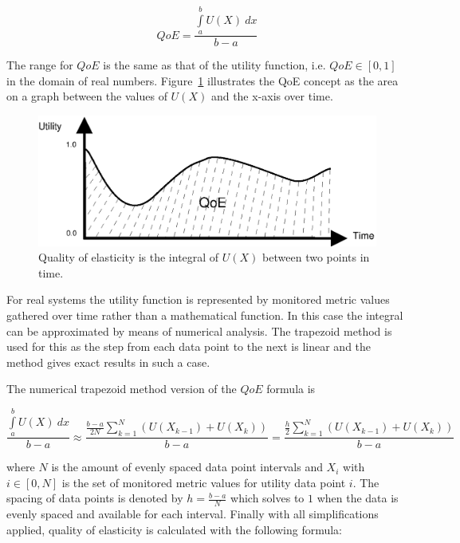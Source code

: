 \documentclass[english]{tktltiki2}
\theoremstyle{definition}
\theoremstyle{remark}
\begin{document}
\begin{equation}
QoE = \frac{\int\limits_a^b U(X)~dx}{b-a} \label{eq:qoefunction}
\end{equation}

The range for $QoE$ is the same as that of the utility function, i.e. $QoE \in [0, 1]$ in the domain of real numbers. Figure~\ref{fig:utility-qoe} illustrates the QoE concept as the area on a graph between the values of $U(X)$ and the x-axis over time.

\begin{figure}[h!]
	\includegraphics[width=\textwidth]{images/utility-qoe}
	\caption{Quality of elasticity is the integral of $U(X)$ between two points in 
	time.}
	\label{fig:utility-qoe}
\end{figure}


For real systems the utility function is represented by monitored metric values
gathered over time rather than a mathematical function. In this case the
integral can be approximated by means of numerical analysis. The trapezoid
method \cite{stewart2010calculus} is used for this as the step from each data
point to the next is linear and the method gives exact results in such a case.

The numerical trapezoid method version of the $QoE$ formula is

\begin{equation}
\frac{\int\limits_a^b U(X)~dx}{b-a} \approx 
\frac{\frac{b-a}{2N}\sum\limits_{k=1}^N (U(X_{k-1}) + U(X_{k}))}{b-a} = 
\frac{\frac{h}{2}\sum\limits_{k=1}^N (U(X_{k-1}) + U(X_{k}))}{b-a} 
\label{eq:qoefunctionnumerical}
\end{equation}

where $N$ is the amount of evenly spaced data point intervals and $X_{i}$ with
$i \in [0, N]$ is the set of monitored metric values for utility data
point $i$. The spacing of data points is denoted by $h = \frac{b-a}{N}$ which
solves to $1$ when the data is evenly spaced and available for each interval.
Finally with all simplifications applied, quality of elasticity is calculated
with the following formula:
\end{document}
